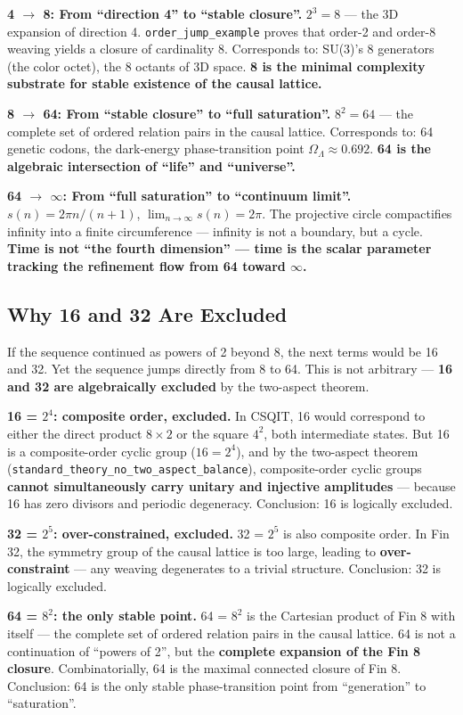 \documentclass[aps,prd,twocolumn,nofootinbib,floatfix]{revtex4-2}
\begin{document}
\textbf{4 $\to$ 8: From ``direction 4'' to ``stable closure''.} $2^3 = 8$ --- the 3D expansion of direction 4. \texttt{order\_jump\_example} proves that order-2 and order-8 weaving yields a closure of cardinality 8. Corresponds to: SU(3)'s 8 generators (the color octet), the 8 octants of 3D space. \textbf{8 is the minimal complexity substrate for stable existence of the causal lattice.}

\textbf{8 $\to$ 64: From ``stable closure'' to ``full saturation''.} $8^2 = 64$ --- the complete set of ordered relation pairs in the causal lattice. Corresponds to: 64 genetic codons, the dark-energy phase-transition point $\Omega_\Lambda \approx 0.692$. \textbf{64 is the algebraic intersection of ``life'' and ``universe''.}

\textbf{64 $\to$ $\infty$: From ``full saturation'' to ``continuum limit''.} $s(n) = 2\pi n/(n+1)$, $\lim_{n\to\infty} s(n) = 2\pi$. The projective circle compactifies infinity into a finite circumference --- infinity is not a boundary, but a cycle. \textbf{Time is not ``the fourth dimension'' --- time is the scalar parameter tracking the refinement flow from 64 toward $\infty$.}

\subsection{Why 16 and 32 Are Excluded}

If the sequence continued as powers of 2 beyond 8, the next terms would be 16 and 32. Yet the sequence jumps directly from 8 to 64. This is not arbitrary --- \textbf{16 and 32 are algebraically excluded} by the two-aspect theorem.

\textbf{16 = $2^4$: composite order, excluded.} In CSQIT, 16 would correspond to either the direct product $8 \times 2$ or the square $4^2$, both intermediate states. But 16 is a composite-order cyclic group ($16 = 2^4$), and by the two-aspect theorem (\texttt{standard\_theory\_no\_two\_aspect\_balance}), composite-order cyclic groups \textbf{cannot simultaneously carry unitary and injective amplitudes} --- because 16 has zero divisors and periodic degeneracy. Conclusion: 16 is logically excluded.

\textbf{32 = $2^5$: over-constrained, excluded.} 32 = $2^5$ is also composite order. In Fin 32, the symmetry group of the causal lattice is too large, leading to \textbf{over-constraint} --- any weaving degenerates to a trivial structure. Conclusion: 32 is logically excluded.

\textbf{64 = $8^2$: the only stable point.} 64 = $8^2$ is the Cartesian product of Fin 8 with itself --- the complete set of ordered relation pairs in the causal lattice. 64 is not a continuation of ``powers of 2'', but the \textbf{complete expansion of the Fin 8 closure}. Combinatorially, 64 is the maximal connected closure of Fin 8. Conclusion: 64 is the only stable phase-transition point from ``generation'' to ``saturation''.
\end{document}
